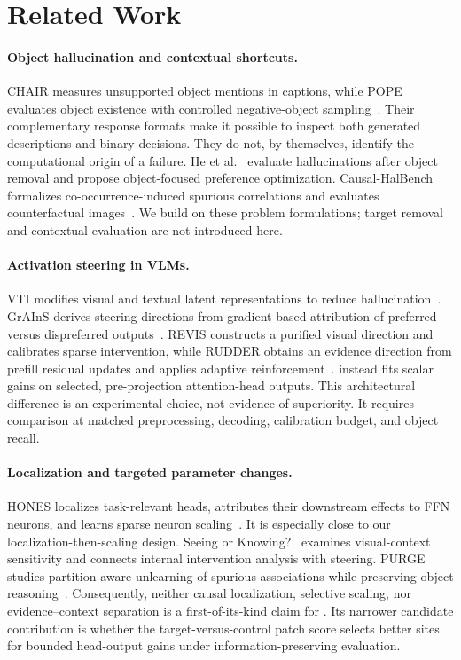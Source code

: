 \section{Related Work}
\label{sec:related}

\paragraph{Object hallucination and contextual shortcuts.}
CHAIR measures unsupported object mentions in captions, while POPE evaluates
object existence with controlled negative-object sampling~\cite{chair,pope}.
Their complementary response formats make it possible to inspect both
generated descriptions and binary decisions. They do not, by themselves,
identify the computational origin of a failure. He
et al.~\cite{removedobjects} evaluate hallucinations after object removal and
propose object-focused preference optimization. Causal-HalBench formalizes
co-occurrence-induced spurious correlations and evaluates counterfactual
images~\cite{causalhalbench}. We build on these problem formulations; target
removal and contextual evaluation are not introduced here.

\paragraph{Activation steering in VLMs.}
VTI modifies visual and textual latent representations to reduce
hallucination~\cite{vti}. GrAInS derives steering directions from
gradient-based attribution of preferred versus dispreferred
outputs~\cite{grains}. REVIS constructs a purified visual direction and
calibrates sparse intervention, while RUDDER obtains an evidence direction
from prefill residual updates and applies adaptive
reinforcement~\cite{revis,rudder}. \method instead fits scalar gains on
selected, pre-projection attention-head outputs. This architectural
difference is an experimental choice, not evidence of superiority. It
requires comparison at matched preprocessing, decoding, calibration budget,
and object recall.

\paragraph{Localization and targeted parameter changes.}
HONES localizes task-relevant heads, attributes their downstream effects to
FFN neurons, and learns sparse neuron scaling~\cite{hones}. It is especially
close to our localization-then-scaling design. Seeing or
Knowing?~\cite{seeingknowing} examines visual-context sensitivity and connects
internal intervention analysis with steering. PURGE studies partition-aware
unlearning of spurious associations while preserving object
reasoning~\cite{purge}. Consequently, neither causal localization, selective
scaling, nor evidence--context separation is a first-of-its-kind claim for
\method. Its narrower candidate contribution is whether the
target-versus-control patch score selects better sites for bounded
head-output gains under information-preserving evaluation.

